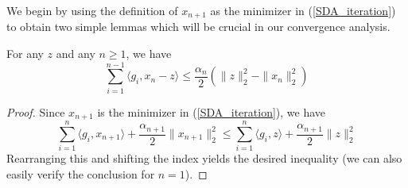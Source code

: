 We begin by using the definition of $x_{n+1}$ as the minimizer in (\ref{SDA_iteration}) to obtain two simple lemmas which will
be crucial in our convergence analysis.
\begin{lemma}\label{lemma558}
 For any $z$ and any $n \geq 1$, we have
 \begin{equation}
  \displaystyle\sum_{i = 1}^{n-1} \langle g_i, x_n - z\rangle \leq \frac{\alpha_n}{2}(\|z\|_2^2 - \|x_n\|_2^2)
 \end{equation}

\end{lemma}
\begin{proof}
 Since $x_{n+1}$ is the minimizer in (\ref{SDA_iteration}), we have
 \begin{equation}
  \displaystyle\sum_{i = 1}^n \langle g_i, x_{n+1}\rangle + \frac{\alpha_{n+1}}{2}\|x_{n+1}\|_2^2 \leq \displaystyle\sum_{i = 1}^n \langle g_i, z\rangle + \frac{\alpha_{n+1}}{2}\|z\|_2^2
 \end{equation}
 Rearranging this and shifting the index yields the desired inequality (we can also easily verify the conclusion for $n = 1$).
\end{proof}

